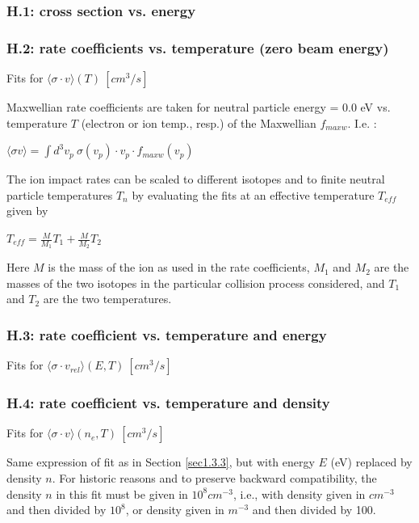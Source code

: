 \documentclass[12pt,dvips]{article}
\begin{document}
\subsubsection*{H.1: cross section vs. energy}\label{sec1.3.1}
\subsubsection*{H.2: rate coefficients vs. temperature (zero beam energy)}\label{sec1.3.2}
Fits for $\langle\sigma \cdot v  \rangle (T) \ [cm^3/s]$

Maxwellian rate coefficients are taken for neutral particle energy = 0.0 eV
vs. temperature $T$ (electron or ion temp., resp.) of the Maxwellian $f_{maxw}$.
I.e. :

$\langle\sigma v \rangle = \int d^3v_p \ \sigma(v_{p}) \cdot v_{p} \cdot
f_{maxw}(v_{p})$

The ion impact rates can be scaled to different isotopes and to finite
neutral particle temperatures $T_n$ by evaluating the fits at an
effective temperature $T_{eff}$ given by

$T_{eff} = \frac {M}{M_1} T_1 + \frac{M}{M_2} T_2 $

Here $M$ is the mass of the ion as used in the rate coefficients,
$M_1$ and $M_2$ are the masses of the two isotopes in the particular collision
process considered, and $T_1$ and $T_2$ are the two temperatures.
\subsubsection*{H.3: rate coefficient vs. temperature and energy}\label{sec1.3.3}
Fits for $\langle\sigma \cdot v_{rel}  \rangle (E,T) \ [cm^3/s]$
\subsubsection*{H.4: rate coefficient vs. temperature and density}\label{sec1.3.4}
Fits for $\langle\sigma \cdot v  \rangle (n_e,T) \ [cm^3/s]$

Same expression of fit as in Section \ref{sec1.3.3}, but with energy
$E$ (eV) replaced by density $n$. For historic reasons and to
preserve backward compatibility, the density $n$ in this fit must be
given in $10^8 cm^{-3}$, i.e., with density given in $cm^{-3}$ and
then divided by $10^8$, or density given in $m^{-3}$ and then
divided by 100.
\end{document}
